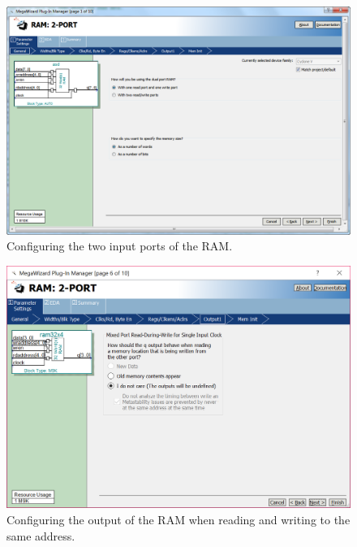 \documentclass[epsfig,10pt,fullpage]{article}
\begin{document}
\begin{figure}[H]
	\begin{center}
		\includegraphics[scale=0.50]{figures/figure4.png}
	\end{center}
	\caption{Configuring the two input ports of the RAM.}
	\label{fig:fig4}
\end{figure}

\begin{figure}[H]
	\begin{center}
		\includegraphics[scale=0.50]{figures/figure5.png}
	\end{center}
	\caption{Configuring the output of the RAM when reading and writing to the same address.}
	\label{fig:fig5}
\end{figure}
\end{document}
